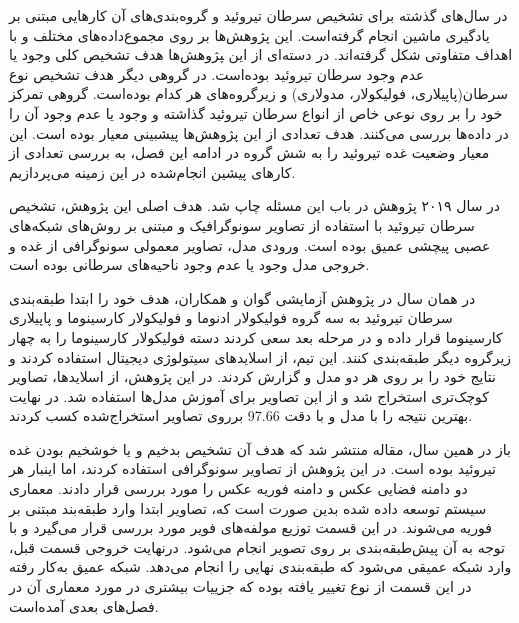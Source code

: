 در سال‌های گذشته برای تشخیص سرطان تیروئید و گروه‌بندی‌های آن‌ کارهایی مبتنی بر یادگیری ماشین انجام گرفته‌است.
این پژوهش‌ها بر روی مجموع‌داده‌های مختلف و با اهداف متفاوتی شکل گرفته‌اند.
در دسته‌ای از این ‍‍پژوهش‌ها هدف تشخیص کلی وجود یا عدم وجود سرطان تیروئید بوده‌است.
در گروهی دیگر هدف تشخیص نوع سرطان(پاپیلاری، فولیکولار، مدولاری) و زیر‌گروه‌های هر کدام بوده‌است.
گروهی تمرکز خود را بر روی نوعی خاص از انواع سرطان تیروئید گذاشته و وجود یا عدم وجود آن را در داده‌ها بررسی می‌کنند.
هدف تعدادی از این پژوهش‌ها پیشبینی معیار  بوده است. این معیار وضعیت غده تیروئید را به شش گروه 
در ادامه این فصل، به بررسی تعدادی از کارهای پیشین انجام‌شده در این زمینه می‌پردازیم.

در سال ۲۰۱۹ پژوهش \cite{li2019diagnosis} در باب این مسئله چاپ شد.
هدف اصلی این پژوهش، تشخیص سرطان تیروئید با استفاده از تصاویر سونوگرافیک و مبتنی بر روش‌های شبکه‌های عصبی پیچشی عمیق بوده است. ورودی مدل، تصاویر معمولی سونوگرافی از غده و خروجی مدل وجود یا عدم وجود ناحیه‌های سرطانی بوده ‌است.

در همان سال در پژوهش آزمایشی \cite{guan2019deep} گوان و همکاران، هدف خود را ابتدا طبقه‌بندی سرطان تیروئید به سه گروه فولیکولار ادنوما و فولیکولار کارسینوما و پاپیلاری کارسینوما قرار داده و در مرحله بعد سعی کردند دسته فولیکولار کارسینوما را به چهار زیر‌گروه دیگر طبقه‌بندی کنند. این تیم، از اسلاید‌های سیتولوژی دیجیتال استفاده کردند و نتایج خود را بر روی هر دو مدل  و  گزارش کردند.
در این پژوهش، از اسلاید‌ها، تصاویر کوچک‌تری استخراج شد و از این تصاویر برای آموزش مدل‌ها استفاده شد. 
در نهایت بهترین نتیجه را با مدل  و با دقت 97.66 برروی تصاویر استخراج‌شده کسب کردند.

باز در همین سال، مقاله \cite{nguyen2019artificial} منتشر شد که هدف آن تشخیص بد‌خیم و یا خوشخیم بودن غده تیروئید بوده است.
در این پژوهش از تصاویر سونوگرافی استفاده کردند، اما اینبار هر دو دامنه فضایی عکس و دامنه فوریه عکس را مورد بررسی قرار دادند.
معماری سیستم توسعه داده شده بدین صورت است که، تصاویر ابتدا وارد طبقه‌بند مبتنی بر فوریه می‌شوند.
در این قسمت توزیع مولفه‌های فویر مورد بررسی قرار می‌گیرد و با توجه به آن پیش‌طبقه‌بندی بر روی تصویر انجام می‌شود.
درنهایت خروجی قسمت قبل، وارد شبکه عمیقی می‌شود که طبقه‌بندی نهایی را انجام می‌دهد.
شبکه عمیق به‌کار رفته در این قسمت از نوع  تغییر یافته بوده که جزییات بیشتری در مورد معماری آن در فصل‌های بعدی آمده‌است.

